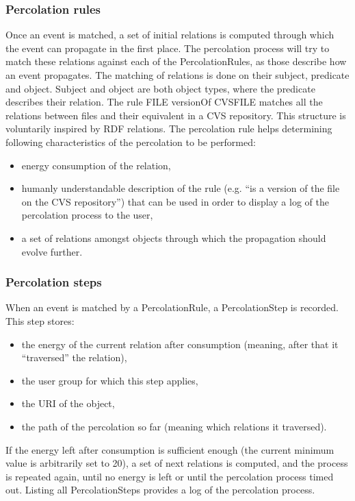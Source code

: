 \documentclass{ecscw2007}
\begin{document}
\subsubsection*{Percolation rules}
Once an event is matched, a set of initial relations is computed through which the event can propagate in the first place. The percolation process will try to match these relations against each of the PercolationRules, as those describe how an event propagates.
The matching of relations is done on their subject, predicate and object. Subject and object are both object types, where the predicate describes their relation. The rule
FILE versionOf CVSFILE
matches all the relations between files and their equivalent in a CVS repository. This structure is voluntarily inspired by RDF relations.
The percolation rule helps determining following characteristics of the percolation to be performed:
\begin{itemize}
    \item energy consumption of the relation,
    \item humanly understandable description of the rule (e.g. ``is a version of the file on the CVS repository'') that can be used in order to display a log of the percolation process to the user,
    \item  a set of relations amongst objects through which the propagation should evolve further.
\end{itemize}

\subsubsection*{Percolation steps}
When an event is matched by a PercolationRule, a PercolationStep is recorded. This step stores:
\begin{itemize}
	\item the energy of the current relation after consumption (meaning, after that it ``traversed'' the relation),
    \item the user group for which this step applies,
    \item the URI of the object,
    \item the path of the percolation so far (meaning which relations it traversed).
\end{itemize}
    
If the energy left after consumption is sufficient enough (the current minimum value is arbitrarily set to 20), a set of next relations is computed, and the process is repeated again, until no energy is left or until the percolation process timed out.
Listing all PercolationSteps provides a log of the percolation process.
\end{document}
